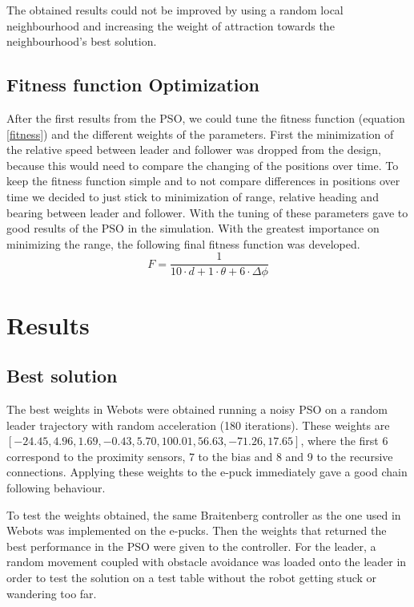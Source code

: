 \documentclass[a4paper, 10pt, conference]{ieeeconf}      %
\begin{document}
The obtained results could not be improved by using a random local neighbourhood and increasing the weight of attraction towards the neighbourhood's best solution.

\subsection{Fitness function Optimization}
After the first results from the PSO, we could tune the fitness function (equation \ref{fitness}) and the different weights of the parameters. First the minimization of the relative speed between leader and follower was dropped from the design, because this would need to compare the changing of the positions over time. To keep the fitness function simple and to not compare differences in positions over time we decided to just stick to minimization of range, relative heading and bearing between leader and follower. With the tuning of these parameters gave to good results of the PSO in the simulation. With the greatest importance on minimizing the range, the following final fitness function was developed.
\begin{equation}\label{fitness}
F=\frac{1}{10 \cdot d+1 \cdot \theta+6 \cdot \Delta \phi}
\end{equation}


\section{Results}
\subsection{Best solution} The best weights in Webots were obtained running a noisy PSO on a random leader trajectory with random acceleration (180 iterations). These weights are $[-24.45, 4.96, 1.69, -0.43, 5.70, 100.01, 56.63, -71.26, 17.65]$, where the first 6 correspond to the proximity sensors, 7 to the bias and 8 and 9 to the recursive connections. Applying these weights to the e-puck immediately gave a good chain following behaviour.

To test the weights obtained, the same Braitenberg controller as the one used in Webots was implemented on the e-pucks. Then the weights that returned the best performance in the PSO were given to the controller. For the leader, a random movement coupled with obstacle avoidance was loaded onto the leader in order to test the solution on a test table without the robot getting stuck or wandering too far.
\end{document}
